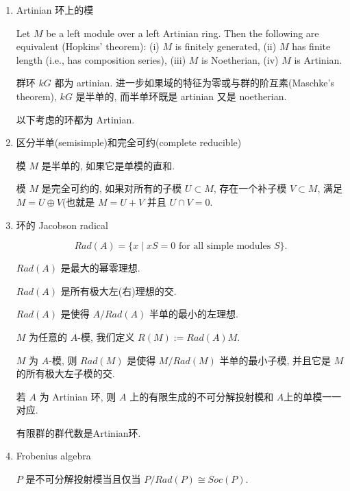 \documentclass{ctexart}
\begin{document}
\begin{enumerate}
\item Artinian 环上的模

Let $M$ be a left module over a left Artinian ring. Then the following are equivalent (Hopkins' theorem): (i) $M$ is finitely generated, (ii) $M$ has finite length (i.e., has composition series), (iii) $M$ is Noetherian, (iv) $M$ is Artinian.

群环 $kG$ 都为 artinian. 进一步如果域的特征为零或与群的阶互素(Maschke's theorem), $kG$ 是半单的, 而半单环既是 artinian 又是 noetherian.

以下考虑的环都为 Artinian.

\item 区分半单(semisimple)和完全可约(complete reducible)

模 $M$ 是半单的, 如果它是单模的直和.

模 $M$ 是完全可约的, 如果对所有的子模 $U\subset M$, 存在一个补子模 $V\subset M$, 满足 $M = U\oplus V$(也就是 $M=U+V$ 并且 $U\cap V = 0$.

\item 环的 Jacobson radical

\[
Rad(A) = \{ x\mid xS = 0 \text{ for all simple modules } S \}.
\]

$Rad(A)$ 是最大的幂零理想.

$Rad(A)$ 是所有极大左(右)理想的交.

$Rad(A)$ 是使得 $A/Rad(A)$ 半单的最小的左理想.

$M$ 为任意的 $A$-模, 我们定义 $R(M) := Rad(A)M$.

$M$ 为 $A$-模, 则 $Rad(M)$ 是使得 $M/Rad(M)$ 半单的最小子模, 并且它是 $M$ 的所有极大左子模的交.

若 $A$ 为 Artinian 环, 则 $A$ 上的有限生成的不可分解投射模和 $A$上的单模一一对应.

有限群的群代数是Artinian环.
\item Frobenius algebra

$P$ 是不可分解投射模当且仅当 $P/Rad(P)\cong Soc(P)$.
\end{enumerate}
\end{document}
